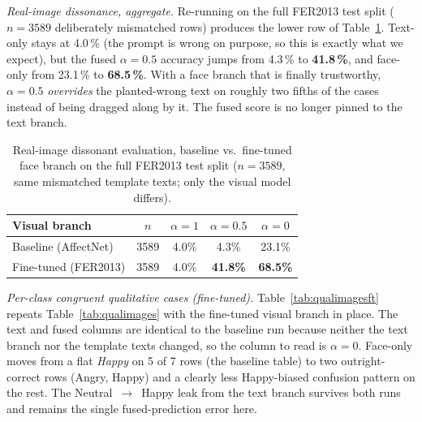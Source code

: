 \documentclass[sigconf,nonacm]{acmart}
\begin{document}
\emph{Real-image dissonance, aggregate.} Re-running  on the full FER2013 test split ($n\!=\!3589$ deliberately mismatched rows) produces the lower row of Table~\ref{tab:dissonanceft}. Text-only stays at 4.0\,\% (the prompt is wrong on purpose, so this is exactly what we expect), but the fused $\alpha\!=\!0.5$ accuracy jumps from 4.3\,\% to \textbf{41.8\,\%}, and face-only from 23.1\,\% to \textbf{68.5\,\%}. With a face branch that is finally trustworthy, $\alpha\!=\!0.5$ \emph{overrides} the planted-wrong text on roughly two fifths of the cases instead of being dragged along by it. The fused score is no longer pinned to the text branch.

\begin{table}[t]
  \centering
  \small
  \caption{Real-image dissonant evaluation, baseline vs.\ fine-tuned face branch on the full FER2013 test split ($n\!=\!3589$, same mismatched template texts; only the visual model differs).}
  \label{tab:dissonanceft}
  \setlength{\tabcolsep}{3pt}
  \begin{tabular}{@{}p{2.7cm}cccc@{}}
    \toprule
    \textbf{Visual branch} & \textbf{$n$} & \textbf{$\alpha\!=\!1$} & \textbf{$\alpha\!=\!0.5$} & \textbf{$\alpha\!=\!0$} \\
    \midrule
    Baseline (AffectNet)            & 3589 & 4.0\% & 4.3\%  & 23.1\% \\
    Fine-tuned (FER2013)            & 3589 & 4.0\% & \textbf{41.8\%} & \textbf{68.5\%} \\
    \bottomrule
  \end{tabular}
\end{table}

\emph{Per-class congruent qualitative cases (fine-tuned).} Table~\ref{tab:qualimagesft} repeats Table~\ref{tab:qualimages} with the fine-tuned visual branch in place. The text and fused columns are identical to the baseline run because neither the text branch nor the template texts changed, so the column to read is $\alpha\!=\!0$. Face-only moves from a flat \emph{Happy} on 5 of 7 rows (the baseline table) to two outright-correct rows (Angry, Happy) and a clearly less Happy-biased confusion pattern on the rest. The Neutral~$\to$~Happy leak from the text branch survives both runs and remains the single fused-prediction error here.
\end{document}
